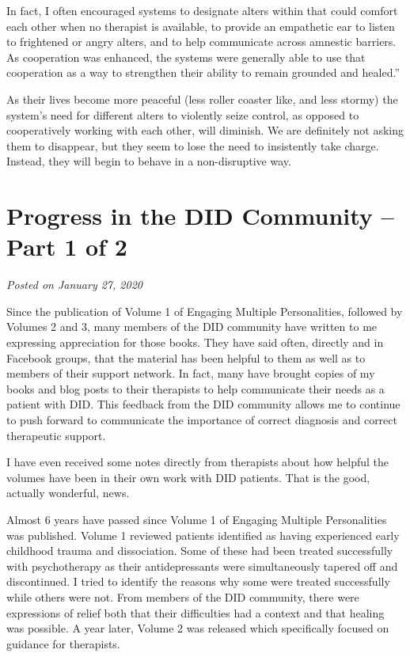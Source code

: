 \documentclass[]{book}
\begin{document}
In fact, I often encouraged systems to designate alters within that could comfort each other when no therapist is available, to provide an empathetic ear to listen to frightened or angry alters, and to help communicate across amnestic barriers. As cooperation was enhanced, the systems were generally able to use that cooperation as a way to strengthen their ability to remain grounded and healed.''

As their lives become more peaceful (less roller coaster like, and less stormy) the system's need for different alters to violently seize control, as opposed to cooperatively working with each other, will diminish. We are definitely not asking them to disappear, but they seem to lose the need to insistently take charge. Instead, they will begin to behave in a non-disruptive way.

\hypertarget{progress-in-the-did-community-part-1-of-2}{%
\section{Progress in the DID Community -- Part 1 of 2}\label{progress-in-the-did-community-part-1-of-2}}

\emph{Posted on January 27, 2020}

Since the publication of Volume 1 of Engaging Multiple Personalities, followed by Volumes 2 and 3, many members of the DID community have written to me expressing appreciation for those books. They have said often, directly and in Facebook groups, that the material has been helpful to them as well as to members of their support network. In fact, many have brought copies of my books and blog posts to their therapists to help communicate their needs as a patient with DID. This feedback from the DID community allows me to continue to push forward to communicate the importance of correct diagnosis and correct therapeutic support.

I have even received some notes directly from therapists about how helpful the volumes have been in their own work with DID patients. That is the good, actually wonderful, news.

Almost 6 years have passed since Volume 1 of Engaging Multiple Personalities was published. Volume 1 reviewed patients identified as having experienced early childhood trauma and dissociation. Some of these had been treated successfully with psychotherapy as their antidepressants were simultaneously tapered off and discontinued. I tried to identify the reasons why some were treated successfully while others were not. From members of the DID community, there were expressions of relief both that their difficulties had a context and that healing was possible. A year later, Volume 2 was released which specifically focused on guidance for therapists.
\end{document}
